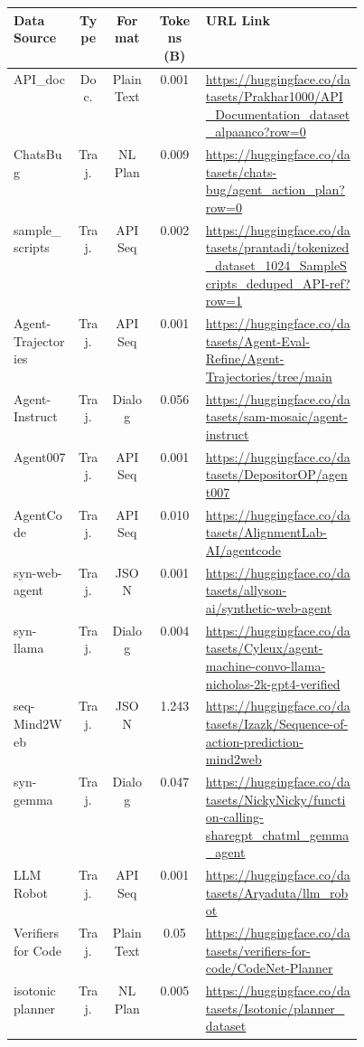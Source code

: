 \begin{table*}[ht]
\centering 
\renewcommand\arraystretch{0.98}
\fontsize{8}{10}\selectfont \setlength{\tabcolsep}{0.4em}
\begin{tabular}{@{}lcccp{0.45\linewidth}@{}}
\toprule
\textbf{Data Source} & \textbf{Type} & \textbf{Format} & \textbf{Tokens (B)} & \textbf{URL Link}\\\midrule 
API\_doc & Doc. & Plain Text & 0.001 & \url{https://huggingface.co/datasets/Prakhar1000/API_Documentation_dataset_alpaanco?row=0} \\
ChatsBug & Traj. & NL Plan & 0.009 & \url{https://huggingface.co/datasets/chats-bug/agent_action_plan?row=0} \\
sample\_scripts & Traj. & API Seq & 0.002 & \url{https://huggingface.co/datasets/prantadi/tokenized_dataset_1024_SampleScripts_deduped_API-ref?row=1} \\
Agent-Trajectories & Traj. & API Seq & 0.001 & \url{https://huggingface.co/datasets/Agent-Eval-Refine/Agent-Trajectories/tree/main} \\
Agent-Instruct & Traj. & Dialog & 0.056 & \url{https://huggingface.co/datasets/sam-mosaic/agent-instruct} \\
Agent007 & Traj. & API Seq & 0.001 & \url{https://huggingface.co/datasets/DepositorOP/agent007} \\
AgentCode & Traj. & API Seq & 0.010 & \url{https://huggingface.co/datasets/AlignmentLab-AI/agentcode} \\
syn-web-agent & Traj. & JSON & 0.001 & \url{https://huggingface.co/datasets/allyson-ai/synthetic-web-agent} \\
syn-llama & Traj. & Dialog & 0.004 & \url{https://huggingface.co/datasets/Cyleux/agent-machine-convo-llama-nicholas-2k-gpt4-verified} \\
seq-Mind2Web & Traj. & JSON & 1.243 & \url{https://huggingface.co/datasets/Izazk/Sequence-of-action-prediction-mind2web} \\
syn-gemma & Traj. & Dialog & 0.047 & \url{https://huggingface.co/datasets/NickyNicky/function-calling-sharegpt_chatml_gemma_agent} \\
LLM Robot & Traj. & API Seq & 0.001 & \url{https://huggingface.co/datasets/Aryaduta/llm_robot} \\
Verifiers for Code & Traj. & Plain Text & 0.05 & \url{https://huggingface.co/datasets/verifiers-for-code/CodeNet-Planner} \\ 
isotonic planner & Traj. & NL Plan & 0.005 & \url{https://huggingface.co/datasets/Isotonic/planner_dataset} \\ 

\end{tabular}
\end{table*}

